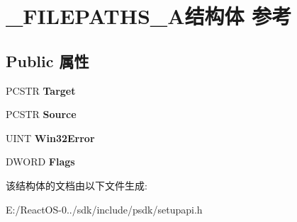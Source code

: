 \hypertarget{struct___f_i_l_e_p_a_t_h_s___a}{}\section{\+\_\+\+F\+I\+L\+E\+P\+A\+T\+H\+S\+\_\+\+A结构体 参考}
\label{struct___f_i_l_e_p_a_t_h_s___a}
\subsection*{Public 属性}
\begin{DoxyCompactItemize}
\item 
\mbox{\label{struct___f_i_l_e_p_a_t_h_s___a_a8e3e92e76e721a771d73f3560d417b73}} 
P\+C\+S\+TR {\bfseries Target}
\item 
\mbox{\label{struct___f_i_l_e_p_a_t_h_s___a_a480c9e8d572aa81b62bc781fc7049db8}} 
P\+C\+S\+TR {\bfseries Source}
\item 
\mbox{\label{struct___f_i_l_e_p_a_t_h_s___a_a9cba300517e6d63816b897e3d57d95e0}} 
U\+I\+NT {\bfseries Win32\+Error}
\item 
\mbox{\label{struct___f_i_l_e_p_a_t_h_s___a_a74abc284b3beecb8ea5534e277fc95c9}} 
D\+W\+O\+RD {\bfseries Flags}
\end{DoxyCompactItemize}


该结构体的文档由以下文件生成\+:\begin{DoxyCompactItemize}
\item 
E\+:/\+React\+O\+S-\/0../sdk/include/psdk/setupapi.\+h\end{DoxyCompactItemize}

